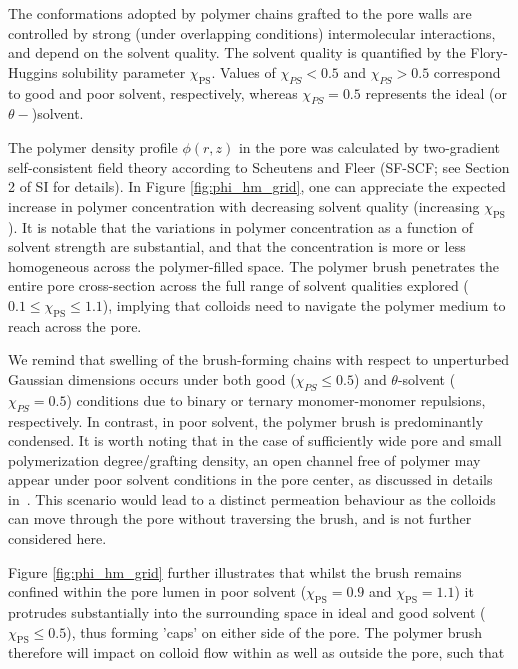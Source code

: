 \documentclass[12pt, a4paper]{article}
\begin{document}
The conformations adopted by polymer chains grafted to the pore walls are controlled by strong (under overlapping conditions) intermolecular interactions, and depend on the solvent quality. 
The solvent quality is quantified by the Flory-Huggins solubility parameter $\chi_{\text{PS}}$. 
Values of $\chi_{PS}<0.5$ and $\chi_{PS}>0.5$ correspond to good and poor solvent, respectively, whereas $\chi_{PS}=0.5$ represents the ideal (or $\theta-$)solvent.

The polymer density profile $\phi(r,z)$ in the pore was calculated by two-gradient self-consistent field theory according to Scheutens and Fleer 
(SF-SCF; see Section 2 of SI for details).
In Figure \ref{fig:phi_hm_grid}, one can appreciate the expected increase in polymer concentration with decreasing solvent quality (increasing $\chi_{\text{PS}}$). 
It is notable that the variations in polymer concentration as a function of solvent strength are substantial, 
and that the concentration is more or less homogeneous across the polymer-filled space. 
The polymer brush penetrates the entire pore cross-section across the full range of solvent qualities explored ($0.1\le\chi_{\text{PS}}\le1.1$), 
implying that colloids need to navigate the polymer medium to reach across the pore.

We remind that swelling of the brush-forming chains with respect to unperturbed Gaussian dimensions occurs under both good ($\chi_{PS} \leq 0.5$) and $\theta$-solvent ($\chi_{PS}= 0.5$) conditions due to binary or ternary monomer-monomer repulsions, respectively.
In contrast, in poor solvent, the polymer brush is predominantly condensed.
It is worth noting that in the case of sufficiently wide pore and small polymerization degree/grafting density, 
an open channel free of polymer may appear under poor solvent conditions in the pore center, as discussed in details in~\cite{Laktionov2021}. 
This scenario would lead to a distinct permeation behaviour as the colloids can move through the pore without traversing the brush, and is not further considered here. 

Figure \ref{fig:phi_hm_grid} further illustrates that whilst the brush remains confined within the pore lumen in poor solvent ($\chi_{\text{PS}}=0.9$ and $\chi_{\text{PS}}=1.1$) 
it protrudes substantially into the surrounding space in ideal and good solvent ($\chi_{\text{PS}}\le0.5$), thus forming 'caps' on either side of the pore.  
The polymer brush therefore will impact on colloid flow within as well as outside the pore, such that
\end{document}

